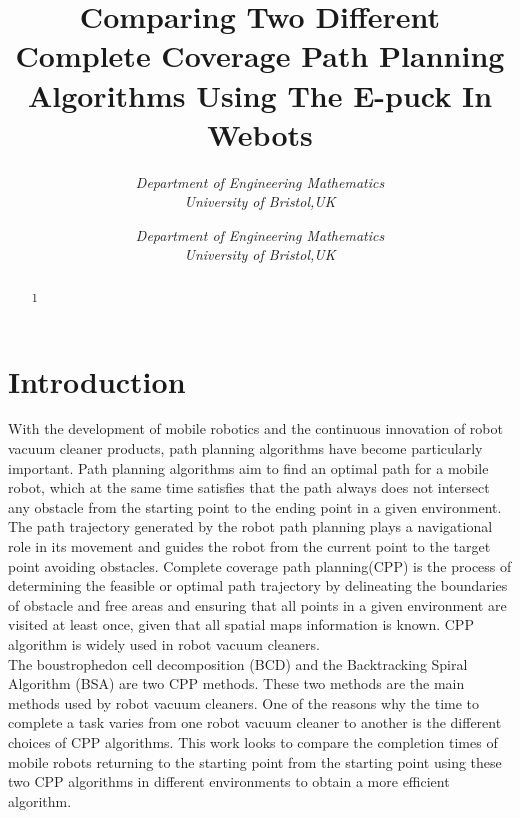 \documentclass[conference]{IEEEtran}
\begin{document}
\title{Comparing Two Different Complete Coverage Path Planning Algorithms Using The E-puck In Webots}

\author{
  \textit{Department of Engineering Mathematics}\\
  \textit{University of Bristol,UK}
  \and
  \textit{Department of Engineering Mathematics}\\
  \textit{University of Bristol,UK}
}

\maketitle

\begin{abstract}
1
\end{abstract}


\section{Introduction}
With the development of mobile robotics and the continuous innovation of robot vacuum cleaner products, path planning algorithms have become particularly important. Path planning algorithms aim to find an optimal path for a mobile robot, which at the same time satisfies that the path always does not intersect any obstacle from the starting point to the ending point in a given environment. The path trajectory generated by the robot path planning plays a navigational role in its movement and guides the robot from the current point to the target point avoiding obstacles. Complete coverage path planning(CPP) is the process of determining the feasible or optimal path trajectory by delineating the boundaries of obstacle and free areas and ensuring that all points in a given environment are visited at least once, given that all spatial maps information is known. CPP algorithm is widely used in robot vacuum cleaners\cite{colegrave1994case}.\\
The boustrophedon cell decomposition (BCD)\cite{lavalle2006planning} and the Backtracking Spiral Algorithm (BSA)\cite{gonzalez2005bsa} are two CPP methods. These two methods are the main methods used by robot vacuum cleaners. One of the reasons why the time to complete a task varies from one robot vacuum cleaner to another is the different choices of CPP algorithms. This work looks to compare the completion times of mobile robots returning to the starting point from the starting point using these two CPP algorithms in different environments to obtain a more efficient algorithm.
\end{document}

